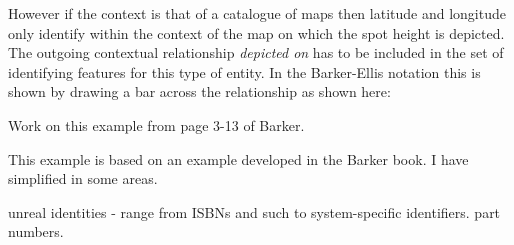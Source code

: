 \begin{center}

\end{center}

However if the context is that of a catalogue of maps then latitude and longitude only identify within the context of the map on which the spot height is depicted. The outgoing contextual relationship \textit{depicted on}
has to be included in the set of identifying features for this type of entity. In the Barker-Ellis notation this is shown by drawing a bar across the relationship as shown here:  

\begin{center}

\end{center}

\mynote Work on this example from page 3-13 of Barker.

{This example is based on an example developed in the Barker book. I have simplified in some areas.}




\begin{noteforfuture}
unreal identities - range from ISBNs and such to system-specific identifiers. part numbers.
\end{noteforfuture}



 
